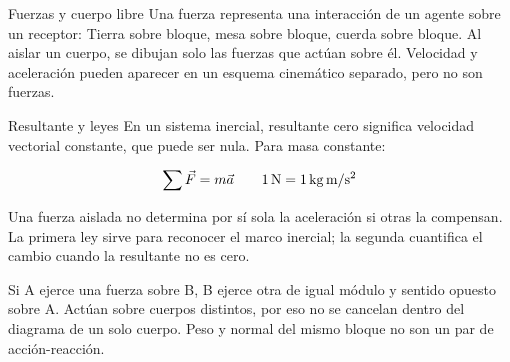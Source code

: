 \documentclass[10pt,a4paper]{article}
\begin{document}
\begin{lessoncard}{Fuerzas y cuerpo libre}
Una fuerza representa una interacci\'on de un agente sobre un receptor: Tierra sobre bloque, mesa sobre bloque, cuerda sobre bloque. Al aislar un cuerpo, se dibujan solo las fuerzas que act\'uan sobre \'el. Velocidad y aceleraci\'on pueden aparecer en un esquema cinem\'atico separado, pero no son fuerzas.

\begin{center}
\end{center}
\end{lessoncard}

\begin{lessoncard}{Resultante y leyes}
En un sistema inercial, resultante cero significa velocidad vectorial constante, que puede ser nula. Para masa constante:
\begin{formulabox}
\[
\sum \vec F=m\vec a \qquad 1\,\mathrm{N}=1\,\mathrm{kg}\,\mathrm{m/s^2}
\]
\end{formulabox}
Una fuerza aislada no determina por s\'i sola la aceleraci\'on si otras la compensan. La primera ley sirve para reconocer el marco inercial; la segunda cuantifica el cambio cuando la resultante no es cero.

Si A ejerce una fuerza sobre B, B ejerce otra de igual m\'odulo y sentido opuesto sobre A. Act\'uan sobre cuerpos distintos, por eso no se cancelan dentro del diagrama de un solo cuerpo. Peso y normal del mismo bloque no son un par de acci\'on-reacci\'on.
\end{lessoncard}
\end{document}
